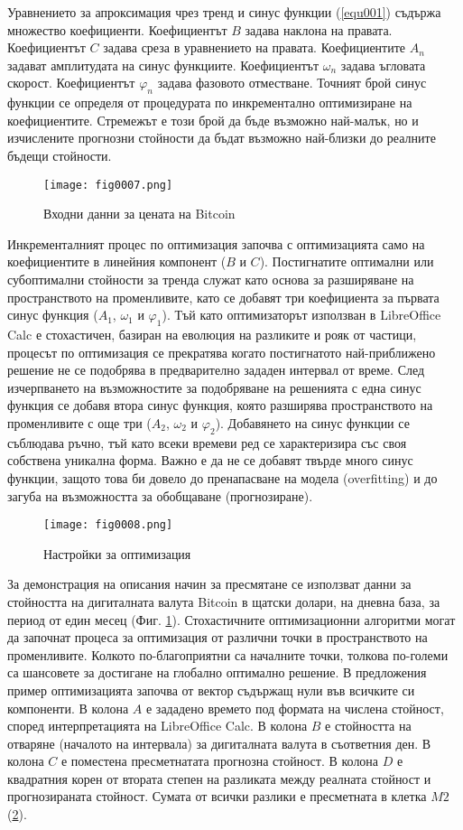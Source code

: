 Уравнението за апроксимация чрез тренд и синус функции (\ref{equ001}) съдържа множество коефициенти. Коефициентът $B$ задава наклона на правата. Коефициентът $C$ задава среза в уравнението на правата. Коефициентите $A_n$ задават амплитудата на синус функциите. Коефициентът $\omega_n$ задава ъгловата скорост. Коефициентът $\varphi_n$ задава фазовото отместване. Точният брой синус функции се определя от процедурата по инкрементално оптимизиране на коефициентите. Стремежът е този брой да бъде възможно най-малък, но и изчислените прогнозни стойности да бъдат възможно най-близки до реалните бъдещи стойности. 

\begin{figure}[H]
  \centering
  \texttt{[image: fig0007.png]}
  \caption{Входни данни за цената на Bitcoin}
\label{fig0007}
\end{figure}

Инкременталният процес по оптимизация започва с оптимизацията само на коефициентите в линейния компонент ($B$ и $C$). Постигнатите оптимални или субоптимални стойности за тренда служат като основа за разширяване на пространството на променливите, като се добавят три коефициента за първата синус функция ($A_1$, $\omega_1$ и $\varphi_1$). Тъй като оптимизаторът използван в LibreOffice Calc е стохастичен, базиран на еволюция на разликите и рояк от частици, процесът по оптимизация се прекратява когато постигнатото най-приближено решение не се подобрява в предварително зададен интервал от време. След изчерпването на възможностите за подобряване на решенията с една синус функция се добавя втора синус функция, която разширява пространството на променливите с още три ($A_2$, $\omega_2$ и $\varphi_2$). Добавянето на синус функции се съблюдава ръчно, тъй като всеки времеви ред се характеризира със своя собствена уникална форма. Важно е да не се добавят твърде много синус функции, защото това би довело до пренапасване на модела (overfitting) и до загуба на възможността за обобщаване (прогнозиране).

\begin{figure}[H]
  \centering
  \texttt{[image: fig0008.png]}
  \caption{Настройки за оптимизация}
\label{fig0008}
\end{figure}

За демонстрация на описания начин за пресмятане се използват данни за стойността на дигиталната валута Bitcoin в щатски долари, на дневна база, за период от един месец (Фиг. \ref{fig0007}). Стохастичните оптимизационни алгоритми могат да започнат процеса за оптимизация от различни точки в пространството на променливите. Колкото по-благоприятни са началните точки, толкова по-големи са шансовете за достигане на глобално оптимално решение. В предложения пример оптимизацията започва от вектор съдържащ нули във всичките си компоненти. В колона $A$ е зададено времето под формата на числена стойност, според интерпретацията на LibreOffice Calc. В колона $B$ е стойността на отваряне (началото на интервала) за дигиталната валута в съответния ден. В колона $C$ е поместена пресметнатата прогнозна стойност. В колона $D$ е квадратния корен от втората степен на разликата между реалната стойност и прогнозираната стойност. Сумата от всички разлики е пресметната в клетка $M2$ (\ref{fig0008}).

